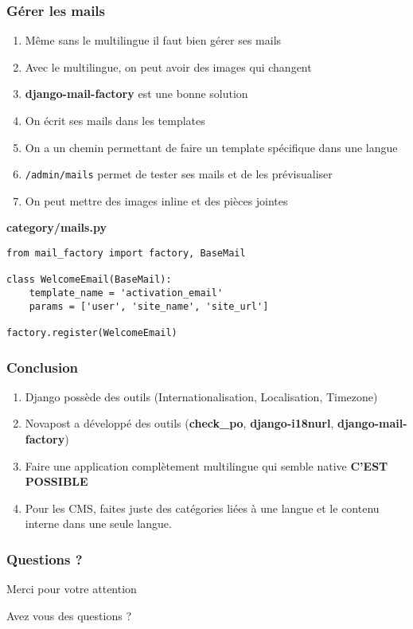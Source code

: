 \documentclass{beamer}
\begin{document}
\begin{frame}[fragile]
  \frametitle{Gérer les mails}
  \vspace{-0.7em}
  \begin{enumerate}
    \item Même sans le multilingue il faut bien gérer ses mails
    \pause \item Avec le multilingue, on peut avoir des images qui changent
    \pause \item \textbf{django-mail-factory} est une bonne solution
    \pause \item On écrit ses mails dans les templates
    \pause \item On a un chemin permettant de faire un template spécifique dans une langue
    \pause \item \texttt{/admin/mails} permet de tester ses mails et de les prévisualiser
    \pause \item On peut mettre des images inline et des pièces jointes
  \end{enumerate}
\pause
\textbf{category/mails.py}
\begin{lstlisting}
from mail_factory import factory, BaseMail

class WelcomeEmail(BaseMail):
    template_name = 'activation_email'
    params = ['user', 'site_name', 'site_url']

factory.register(WelcomeEmail)
\end{lstlisting}
\end{frame}



\begin{frame}
  \frametitle{Conclusion}

  \begin{enumerate}
     \item Django possède des outils (Internationalisation, Localisation, Timezone)
     \pause \item Novapost a développé des outils (\textbf{check\_po}, \textbf{django-i18nurl}, \textbf{django-mail-factory})
     \pause \item Faire une application complètement multilingue qui semble native \pause \textbf{C'EST POSSIBLE}
     \pause \item Pour les CMS, faites juste des catégories liées à une langue et le contenu interne dans une seule langue.
  \end{enumerate}

\end{frame}

\begin{frame}
  \frametitle{Questions ?}
  \vfill
  \Large\centerline{Merci pour votre attention}
  \pause
  \Large\centerline{Avez vous des questions ?}
  \vfill
\end{frame}
\end{document}
